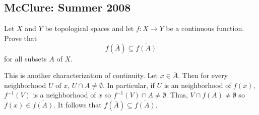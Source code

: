 \subsection{McClure: Summer 2008}
\setcounter{exercise}{0}
\setcounter{equation}{0}

\begin{problem}
  Let \(X\) and \(Y\) be topological spaces and let \(f\colon X\to Y\) be a
  continuous function. Prove that
  \[
    f(\bar A)\subseteq\overline{f(A)}
  \]
  for all subsets \(A\) of \(X\).
\end{problem}
\begin{solution}
  This is another characterization of continuity. Let \(x\in\bar A\). Then
  for every neighborhood \(U\) of \(x\), \(U\cap A\neq\emptyset\). In
  particular, if \(U\) is an neighborhood of \(f(x)\), \(f^{-1}(V)\)
  is a neighborhood of \(x\) so \(f^{-1}(V)\cap A\neq\emptyset\). Thus,
  \(V\cap f(A)\neq\emptyset\) so \(f(x)\in\overline{f(A)}\). It follows
  that \(f(\bar A)\subseteq\overline{f(A)}\).
\end{solution}

